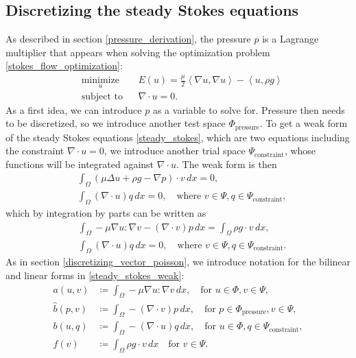 \documentclass[11pt,a4paper]{memoir}
\newcommand{\inner}[1]{\left<#1\right>}
\newcommand{\om}{{\Omega}}
\begin{document}
\subsection{Discretizing the steady Stokes equations}
As described in section \ref{pressure_derivation}, the pressure $p$ is a Lagrange multiplier that appears
when solving the optimization problem \eqref{stokes_flow_optimization}:
\begin{equation*}
\begin{aligned}
& \underset{u}{\text{minimize}}
& & E(u) =  \frac{\mu}{2} \inner{\nabla u, \nabla u} - \inner{u, \rho g}\\
& \text{subject to}
& & \nabla\cdot u = 0.
\end{aligned}
\end{equation*}
\newcommand{\trialconstraint}{{\Psi_{\text{constraint}}}}
\newcommand{\testpressure}{{\Phi_{\text{pressure}}}}
As a first idea, we can introduce $p$ as a variable to solve for.
Pressure then needs to be discretized, so we introduce another test space $\testpressure$.
To get a weak form of the steady Stokes equations \eqref{steady_stokes}, which are two equations including the constraint $\nabla\cdot u = 0$, we introduce
another trial space $\trialconstraint$, whose functions will be integrated against $\nabla\cdot u$. The weak form is then
\begin{equation*}
\begin{split}
    &\int_\om \left(\mu\Delta u + \rho g - \nabla p\right)\cdot v\,dx = 0,\\
    &\int_\om \left(\nabla\cdot u\right) q\,dx = 0, \quad\text{where $v \in \Psi, q \in \trialconstraint$},
\end{split}
\end{equation*}
which by integration by parts can be written as
\begin{equation}\label{steady_stokes_weak}
\begin{split}
    &\int_\om -\mu\nabla u : \nabla v - \left(\nabla\cdot v\right)p\,dx = \int_\om \rho g\cdot v\,dx,\\
    &\int_\om \left(\nabla\cdot u\right) q\,dx = 0, \quad\text{where $v \in \Psi, q \in \trialconstraint$}.
\end{split}
\end{equation}
As in section \ref{discretizing_vector_poisson}, we introduce notation for the bilinear and linear forms in \eqref{steady_stokes_weak}:
\begin{equation}
\begin{split}
    a(u, v) &\coloneqq \int_\om-\mu\nabla u : \nabla v\,dx,\quad\text{for $u \in \Phi, v \in \Psi$},\\
    \hat{b}(p, v) &\coloneqq \int_\om-\left(\nabla\cdot v\right)p\,dx,\quad\text{for $p \in \testpressure, v \in \Psi$},\\
    b(u, q) &\coloneqq \int_\om-\left(\nabla\cdot u\right)q\,dx,\quad\text{for $u \in \Phi, q \in \trialconstraint$},\\
    f(v) &\coloneqq \int_\om \rho g\cdot v\,dx\quad\text{for $v \in \Psi$}.
\end{split}
\end{equation}
\end{document}
